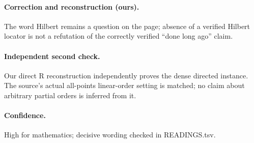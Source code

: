 \paragraph{Correction and reconstruction (ours).} The word Hilbert remains a question on the page; absence of a verified Hilbert locator is not a refutation of the correctly verified “done long ago” claim.

\paragraph{Independent second check.} Our direct R reconstruction independently proves the dense directed instance. The source’s actual all-points linear-order setting is matched; no claim about arbitrary partial orders is inferred from it.

\paragraph{Confidence.} High for mathematics; decisive wording checked in READINGS.tsv.

